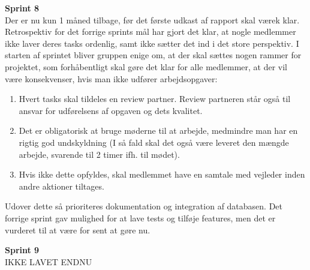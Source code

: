 \documentclass[a4paper,12pt,fleqn,oneside]{article}
\begin{document}
\textbf{Sprint 8}\\
Der er nu kun 1 måned tilbage, før det første udkast af rapport skal værek klar. Retrospektiv for det forrige sprints mål har gjort det klar, at nogle medlemmer ikke laver deres tasks ordenlig, samt ikke sætter det ind i det store perspektiv. I starten af sprintet bliver gruppen enige om, at der skal sættes nogen rammer for projektet, som forhåbentligt skal gøre det klar for alle medlemmer, at der vil være konsekvenser, hvis man ikke udfører arbejdsopgaver:
\begin{enumerate}
    \item Hvert tasks skal tildeles en review partner. Review partneren står også til ansvar for udførelsens af opgaven og dets kvalitet. 
    \item Det er obligatorisk at bruge møderne til at arbejde, medmindre man har en rigtig god undskyldning (I så fald skal det også være leveret den mængde arbejde, svarende til 2 timer ifh. til mødet). 
    \item Hvis ikke dette opfyldes, skal medlemmet have en samtale med vejleder inden andre aktioner tiltages. 
\end{enumerate}
Udover dette så prioriteres dokumentation og integration af databasen. Det forrige sprint gav mulighed for at lave tests og tilføje features, men det er vurderet til at være for sent at gøre nu. 

\textbf{Sprint 9}\\
IKKE LAVET ENDNU 
\end{document}
